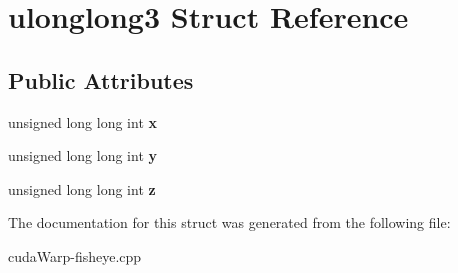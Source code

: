 \hypertarget{structulonglong3}{}\section{ulonglong3 Struct Reference}
\label{structulonglong3}
\subsection*{Public Attributes}
\begin{DoxyCompactItemize}
\item 
unsigned long long int {\bfseries x}\hypertarget{structulonglong3_ad1d18547fb65df5f8013611d8a0748d4}{}\label{structulonglong3_ad1d18547fb65df5f8013611d8a0748d4}

\item 
unsigned long long int {\bfseries y}\hypertarget{structulonglong3_a2285d79f5055e42b8a6584783ef7ed14}{}\label{structulonglong3_a2285d79f5055e42b8a6584783ef7ed14}

\item 
unsigned long long int {\bfseries z}\hypertarget{structulonglong3_aab16fbab593e375d579ced81c6023a1c}{}\label{structulonglong3_aab16fbab593e375d579ced81c6023a1c}

\end{DoxyCompactItemize}


The documentation for this struct was generated from the following file\+:\begin{DoxyCompactItemize}
\item 
cuda\+Warp-\/fisheye.\+cpp\end{DoxyCompactItemize}

